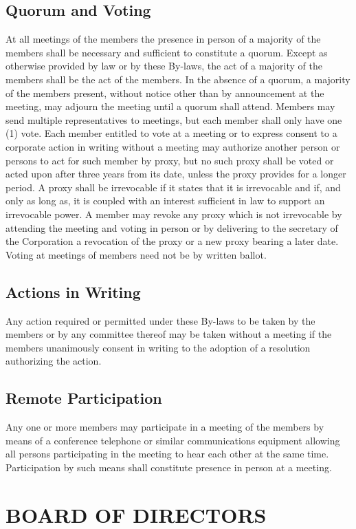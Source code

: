 \documentclass{article}
\begin{document}
\subsection{Quorum and Voting}
At all meetings of the members the presence in person of a majority of the members shall be necessary and sufficient to constitute a quorum. Except as otherwise provided by law or by these By-laws, the act of a majority of the members shall be the act of the members. In the absence of a quorum, a majority of the members present, without notice other than by announcement at the meeting, may adjourn the meeting until a quorum shall attend. Members may send multiple representatives to meetings, but each member shall only have one (1) vote. Each member entitled to vote at a meeting or to express consent to a corporate action in writing without a meeting may authorize another person or persons to act for such member by proxy, but no such proxy shall be voted or acted upon after three years from its date, unless the proxy provides for a longer period. A proxy shall be irrevocable if it states that it is irrevocable and if, and only as long as, it is coupled with an interest sufficient in law to support an irrevocable power. A member may revoke any proxy which is not irrevocable by attending the meeting and voting in person or by delivering to the secretary of the Corporation a revocation of the proxy or a new proxy bearing a later date. Voting at meetings of members need not be by written ballot.
\subsection{Actions in Writing}
Any action required or permitted under these By-laws to be taken by the members or by any committee thereof may be taken without a meeting if the members unanimously consent in writing to the adoption of a resolution authorizing the action.
\subsection{Remote Participation}
Any one or more members may participate in a meeting of the members by means of a conference telephone or similar communications equipment allowing all persons participating in the meeting to hear each other at the same time.  Participation by such means shall constitute presence in person at a meeting.
\section{BOARD OF DIRECTORS}
\end{document}

